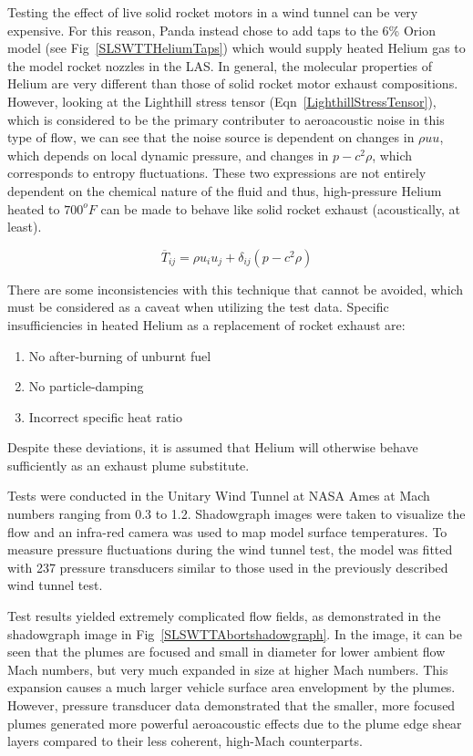 \documentclass[]{aiaa-tc}%
\begin{document}
Testing the effect of live solid rocket motors in a wind tunnel can be very expensive.  For this reason, Panda instead chose to add taps to the 6\% Orion model (see Fig~\ref{SLSWTTHeliumTaps}) which would supply heated Helium gas to the model rocket nozzles in the LAS.  In general, the molecular properties of Helium are very different than those of solid rocket motor exhaust compositions.  However, looking at the Lighthill stress tensor (Eqn~\ref{LighthillStressTensor}), which is considered to be the primary contributer to aeroacoustic noise in this type of flow, we can see that the noise source is dependent on changes in $\rho u u$, which depends on local dynamic pressure, and changes in $p - c^2\rho$, which corresponds to entropy fluctuations.  These two expressions are not entirely dependent on the chemical nature of the fluid and thus, high-pressure Helium heated to $700^oF$ can be made to behave like solid rocket exhaust (acoustically, at least).

\begin{equation}
\overline{T}_{ij} = \rho u_i u_j + \delta_{ij} \left( p - c^2\rho \right)
\label{LighthillStressTensor}
\end{equation}

There are some inconsistencies with this technique that cannot be avoided, which must be considered as a caveat when utilizing the test data.  Specific insufficiencies in heated Helium as a replacement of rocket exhaust are:

\begin{enumerate}
  \item No after-burning of unburnt fuel
  \item No particle-damping
  \item Incorrect specific heat ratio
\end{enumerate}

\noindent Despite these deviations, it is assumed that Helium will otherwise behave sufficiently as an exhaust plume substitute.

Tests were conducted in the Unitary Wind Tunnel at NASA Ames at Mach numbers ranging from 0.3 to 1.2.  Shadowgraph images were taken to visualize the flow and an infra-red camera was used to map model surface temperatures.  To measure pressure fluctuations during the wind tunnel test, the model was fitted with 237 pressure transducers similar to those used in the previously described wind tunnel test.

Test results yielded extremely complicated flow fields, as demonstrated in the shadowgraph image in Fig~\ref{SLSWTTAbortshadowgraph}.  In the image, it can be seen that the plumes are focused and small in diameter for lower ambient flow Mach numbers, but very much expanded in size at higher Mach numbers.  This expansion causes a much larger vehicle surface area envelopment by the plumes.  However, pressure transducer data demonstrated that the smaller, more focused plumes generated more powerful aeroacoustic effects due to the plume edge shear layers compared to their less coherent, high-Mach counterparts.
\end{document}
